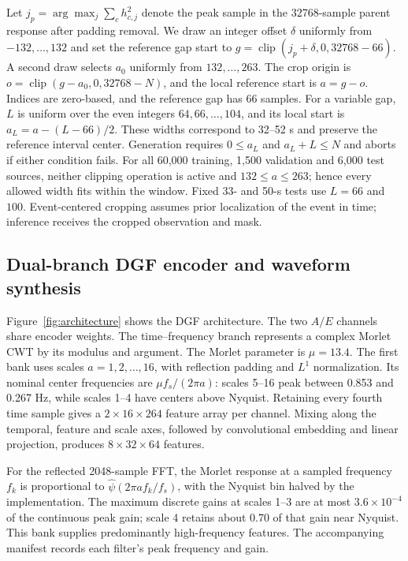 \documentclass[10pt,prd,aps,a4paper,twocolumn,superscriptaddress,nofootinbib,floatfix]{revtex4-2}
\begin{document}
Let $j_p=\arg\max_j\sum_ch_{c,j}^2$ denote the peak sample in the 32768-sample parent response after padding removal. We draw an integer offset $\delta$ uniformly from $-132,\ldots,132$ and set the reference gap start to $g=\operatorname{clip}(j_p+\delta,0,32768-66)$. A second draw selects $a_0$ uniformly from $132,\ldots,263$. The crop origin is $o=\operatorname{clip}(g-a_0,0,32768-N)$, and the local reference start is $a=g-o$. Indices are zero-based, and the reference gap has 66 samples. For a variable gap, $L$ is uniform over the even integers $64,66,\ldots,104$, and its local start is $a_L=a-(L-66)/2$. These widths correspond to 32--52 s and preserve the reference interval center. Generation requires $0\le a_L$ and $a_L+L\le N$ and aborts if either condition fails. For all 60,000 training, 1,500 validation and 6,000 test sources, neither clipping operation is active and $132\le a\le263$; hence every allowed width fits within the window. Fixed 33- and 50-s tests use $L=66$ and $100$. Event-centered cropping assumes prior localization of the event in time; inference receives the cropped observation and mask.

\subsection{Dual-branch DGF encoder and waveform synthesis}\label{sec:architecture}
Figure~\ref{fig:architecture} shows the DGF architecture. The two $A/E$ channels share encoder weights. The time--frequency branch represents a complex Morlet CWT by its modulus and argument. The Morlet parameter is $\mu=13.4$. The first bank uses scales $a=1,2,\ldots,16$, with reflection padding and $L^1$ normalization. Its nominal center frequencies are $\mu f_s/(2\pi a)$: scales 5--16 peak between 0.853 and 0.267 Hz, while scales 1--4 have centers above Nyquist. Retaining every fourth time sample gives a $2\times16\times264$ feature array per channel. Mixing along the temporal, feature and scale axes, followed by convolutional embedding and linear projection, produces $8\times32\times64$ features.

For the reflected 2048-sample FFT, the Morlet response at a sampled frequency $f_k$ is proportional to $\widehat\psi(2\pi a f_k/f_s)$, with the Nyquist bin halved by the implementation. The maximum discrete gains at scales 1--3 are at most $3.6\times10^{-4}$ of the continuous peak gain; scale 4 retains about 0.70 of that gain near Nyquist. This bank supplies predominantly high-frequency features. The accompanying manifest records each filter's peak frequency and gain.
\end{document}

